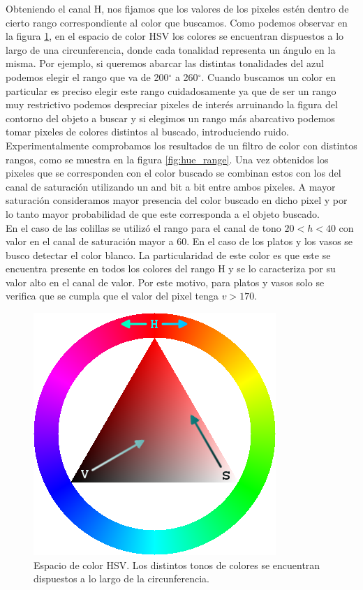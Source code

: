 Obteniendo el canal H, nos fijamos que los valores de los pixeles 
estén dentro de cierto rango correspondiente al color que buscamos. 
Como podemos observar en la figura \ref{fig:hsv_space}, en el espacio 
de color HSV los colores se encuentran dispuestos a lo largo de una 
circunferencia, donde cada tonalidad representa un ángulo en la misma. 
Por ejemplo, si queremos abarcar las distintas tonalidades del azul 
podemos elegir el rango que va de 200$^\circ$ a 260$^\circ$. Cuando 
buscamos un color en particular  es preciso elegir este rango 
cuidadosamente ya que de ser un rango muy restrictivo podemos 
despreciar pixeles de interés arruinando la figura del contorno del 
objeto a buscar y si elegimos un rango más abarcativo podemos tomar 
pixeles de colores distintos al buscado, introduciendo ruido. 
Experimentalmente comprobamos los resultados de un filtro de color con 
distintos rangos, como se muestra  en la figura \ref{fig:hue_range}. 
Una vez obtenidos los pixeles que se corresponden con el color buscado 
se combinan estos con los del canal de saturación utilizando un and 
bit a bit entre ambos pixeles. A mayor saturación consideramos mayor 
presencia del color buscado en dicho pixel y por lo tanto mayor 
probabilidad de que este corresponda a el objeto buscado. \\
\indent En el caso de las colillas se utilizó el rango para el canal de tono 
$20<h<40$ con valor en el canal de saturación mayor a 60. En el caso 
de los platos y los vasos se busco detectar el color blanco. La 
particularidad de este color es que este se encuentra presente en 
todos los colores del rango H y se lo caracteriza por su valor alto en 
el canal de valor. Por este motivo, para platos y vasos solo se verifica que 
se cumpla que el valor del pixel tenga $v>170$.
\begin{figure}[tpb]
\begin{center}
  \includegraphics[scale=0.4]{figuras/hsv_triangle.png}
\end{center}
  \caption{\small Espacio de color HSV. Los distintos tonos de colores se encuentran dispuestos a lo largo de la circunferencia.}
  \label{fig:hsv_space}
\end{figure}

